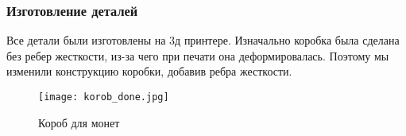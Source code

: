 \subsubsection{Изготовление деталей}

Все детали были изготовлены на 3д принтере. Изначально коробка была сделана без ребер жесткости, из-за чего при печати она деформировалась. 
Поэтому мы изменили конструкцию коробки, добавив ребра жесткости. 

\begin{figure}[H]
	\centering
	\texttt{[image: korob\_done.jpg]}
	\caption{Короб для монет}
	\label{ris:korob_done}
\end{figure}
\par\medskip